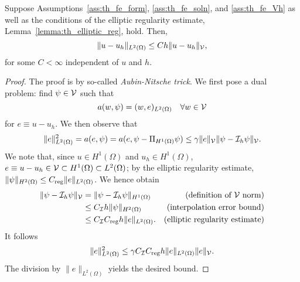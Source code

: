 \begin{proposition}
  \label{prop:th_aubin_nitsche}
  Suppose Assumptions~\ref{ass:th_fe_form}, \ref{ass:th_fe_soln}, and \ref{ass:th_fe_Vh} as well as the conditions of the elliptic regularity estimate, Lemma~\ref{lemma:th_elliptic_reg}, hold. Then, 
  \begin{equation*}
    \| u - u_h \|_{L^2(\Omega)} \leq C h \| u-u_h \|_{\mathcal{V}},
  \end{equation*}
  for some $C < \infty$ independent of $u$ and $h$.
  \begin{proof}
    The proof is by so-called \emph{Aubin-Nitsche trick}. We first pose a dual problem: find $\psi \in \mathcal{V}$ such that
    \begin{equation*}
      a(w,\psi) = (w,e)_{L^2(\Omega)} \quad \forall w \in \mathcal{V}
    \end{equation*}
    for $e \equiv u - u_h$. We then observe that
    \begin{equation*}
      \| e \|_{L^2(\Omega)}^2 = a(e, \psi)
      = a(e, \psi - \Pi_{H^1(\Omega)} \psi)
      \leq \gamma \| e \|_{\mathcal{V}} \| \psi - \mathcal{I}_h \psi \|_{\mathcal{V}}.
    \end{equation*}
    We note that, since $u \in H^1(\Omega)$ and $u_h \in H^1(\Omega)$,  $e \equiv u - u_h \in \mathcal{V} \subset H^1(\Omega) \subset L^2(\Omega)$; by the elliptic regularity estimate, $\| \psi \|_{H^2(\Omega)} \leq C_{\rm reg} \| e \|_{L^2(\Omega)}$. We hence obtain
    \begin{align*}
      \| \psi - \mathcal{I}_h \psi \|_{\mathcal{V}}
      &=\| \psi - \mathcal{I}_h \psi \|_{H^1(\Omega)} & \text{(definition of $\mathcal{V}$ norm)} \\
      &\leq C_{\mathcal{I}} h \| \psi \|_{H^2(\Omega)} & \text{(interpolation error bound)}\\
      &\leq C_{\mathcal{I}} C_{\rm reg} h  \| e \|_{L^2(\Omega)}. & \text{(elliptic regularity estimate)}
    \end{align*}
    It follows
    \begin{equation*}
      \| e \|_{L^2(\Omega)}^2 \leq \gamma C_{\mathcal{I}} C_{\rm reg} h \| e \|_{L^2(\Omega)} \| e \|_{\mathcal{V}} .
    \end{equation*}
    The division by $\| e \|_{L^2(\Omega)}$ yields the desired bound.
  \end{proof}
\end{proposition}

